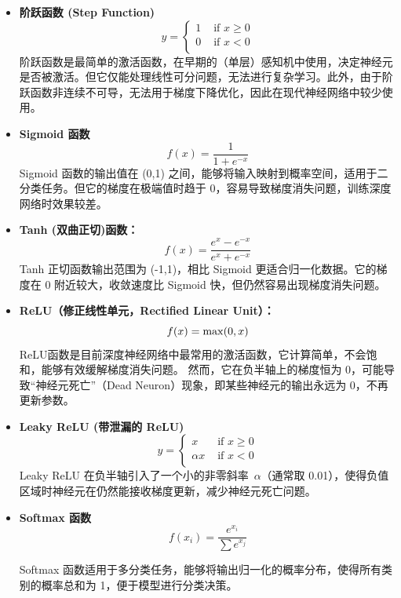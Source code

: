 \begin{itemize}
\item {\bf 阶跃函数 (Step Function)} 
\begin{equation*}
y =\left\{ \begin{array}{ll} 
1 & \mbox{ if } x\ge 0\\
0 & \mbox{ if } x < 0\\ 
\end{array}\right.
\end{equation*} 
阶跃函数是最简单的激活函数，在早期的（单层）感知机中使用，决定神经元是否被激活。但它仅能处理线性可分问题，无法进行复杂学习。此外，由于阶跃函数非连续不可导，无法用于梯度下降优化，因此在现代神经网络中较少使用。

\item {\bf Sigmoid 函数}
$$
 f(x)= \frac{1}{1+e^{-x}}
 $$ 
 Sigmoid 函数的输出值在 (0,1) 之间，能够将输入映射到概率空间，适用于二分类任务。但它的梯度在极端值时趋于 0，容易导致梯度消失问题，训练深度网络时效果较差。
 
\item {\bf Tanh (双曲正切)函数：} 
$$f(x) = \frac{e^{x}-e^{-x}}{e^{x}+e^{-x}}$$ 
Tanh 正切函数输出范围为 (-1,1)，相比 Sigmoid 更适合归一化数据。它的梯度在 0 附近较大，收敛速度比 Sigmoid 快，但仍然容易出现梯度消失问题。  

\item {\bf ReLU（修正线性单元，Rectified Linear Unit）：}
$$
f(x)= {\rm max}(0,x)
$$
ReLU函数是目前深度神经网络中最常用的激活函数，它计算简单，不会饱和，能够有效缓解梯度消失问题。
然而，它在负半轴上的梯度恒为 0，可能导致“神经元死亡”（Dead Neuron）现象，即某些神经元的输出永远为 0，不再更新参数。

\item {\bf Leaky ReLU (带泄漏的 ReLU)}
\begin{equation*}
y =\left\{ \begin{array}{ll} 
x & \mbox{ if } x\ge 0\\
\alpha x & \mbox{ if } x < 0\\ 
\end{array}\right.
\end{equation*} 
Leaky ReLU 在负半轴引入了一个小的非零斜率~$\alpha$（通常取 0.01），使得负值区域时神经元在仍然能接收梯度更新，减少神经元死亡问题。

\item {\bf Softmax 函数}
$$f(x_i) = \frac{e^{x_i}}{ \sum e^{x_j}}$$

 Softmax 函数适用于多分类任务，能够将输出归一化的概率分布，使得所有类别的概率总和为 1，便于模型进行分类决策。   
\end{itemize}

